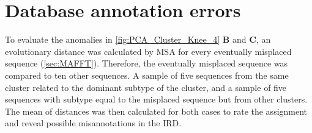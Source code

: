 \section{Database annotation errors} \label{sec:Clustering_Anomalies}

To evaluate the anomalies in \autoref{fig:PCA_Cluster_Knee_4} \textbf{\textsf{B}} and \textbf{\textsf{C}}, an evolutionary distance was calculated by \gls{MSA} for every eventually misplaced sequence (\autoref{sec:MAFFT}). Therefore, the eventually misplaced sequence was compared to ten other sequences. A sample of five sequences from the same cluster related to the dominant subtype of the cluster, and a sample of five sequences with subtype equal to the misplaced sequence but from other clusters. The mean of distances was then calculated for both cases to rate the assignment and reveal possible misannotations in the \gls{IRD}. 

\begin{table}[!hbt]
    \centering
    \caption[Anomalies in segment 4 cluster 2 with PK]{\textbf{Anomalies in segment 4 cluster 2 with PK.} The \glspl{MSA} mean distance of the given sequences in comparison to a sample of H1 sequences of the same cluster and a sample of H10 sequences present in other clusters.}
    \label{tab:PCA_Error_4_2}
\end{table}


